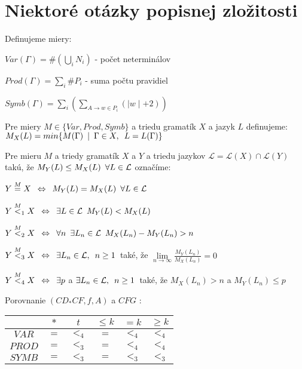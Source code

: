 \section{Niektoré otázky popisnej zložitosti}

\begin{definicia}
Definujeme miery:
\begin{description}
\item{} $Var(\Gamma)=\#(\underset{i}\bigcup N_i)$ - počet neterminálov
\item{} $Prod(\Gamma)=\underset{i}\sum \#P_i$ - suma počtu pravidiel
\item{} $Symb(\Gamma)=\underset{i} \sum(\underset{A\rightarrow w \in P_i} \sum (\mid w
\mid +2))$
\end{description}
\end{definicia}

\begin{definicia}
Pre miery $M \in \{Var, Prod, Symb\}$ a triedu gramatík $X$ a jazyk $L$ definujeme:
$M_X(L)=min\{M(\Gamma)\enspace |\enspace \Gamma \in X,\enspace L=L(\Gamma)\}$
\end{definicia}

\begin{definicia}
Pre mieru $M$ a triedy gramatík $X$ a $Y$ a triedu jazykov
$\mathcal{L}=\mathcal{L}(X)\cap \mathcal{L}(Y)$ takú, že $M_Y(L)\leq M_X(L)\enspace\forall
L\in\mathcal{L}$ označíme:
\begin{description}
\item{} $Y\overset{M}=X \enspace\Leftrightarrow\enspace M_Y(L)=M_X(L) \enspace\forall L\in\mathcal{L}$
\item{} $Y\overset{M}<_1X\enspace\Leftrightarrow\enspace \exists L\in\mathcal{L}\enspace
M_Y(L)<M_X(L)$
\item{} $Y\overset{M}<_2X\enspace\Leftrightarrow\enspace \forall n\enspace\exists L_n\in\mathcal{L}\enspace
M_X(L_n)-M_Y(L_n)>n$
\item{} $Y\overset{M}<_3X\enspace\Leftrightarrow\enspace \exists L_n\in\mathcal{L},\enspace
n\geq 1 \enspace$také, že $\underset{n\rightarrow \infty}\lim\frac{M_Y(L_n)}{M_X(L_n)}=0$
\item{} $Y\overset{M}<_4X\enspace\Leftrightarrow\enspace \exists p$ a $\exists
L_n\in\mathcal{L},\enspace n\geq 1\enspace$také, že $M_X(L_n)>n$ a $M_Y(L_n)\leq p$
\end{description}
\end{definicia}

\begin{veta}
Porovnanie $(CD_*CF,f,A)$ a $CFG$ :
\begin{center}
\begin{tabular}{c||c|c|c|c|c}
       & $*$ &  $t$  & $\leq k$ & $=k$  & $\geq k$  \\
  \hline\hline
$VAR$  & $=$ & $<_4$ & $=$      & $<_4$ & $<_4$    \\
  \hline
$PROD$ & $=$ & $<_3$ & $=$      & $<_4$ & $<_4$    \\
  \hline
$SYMB$ & $=$ & $<_3$ & $=$      & $<_3$ & $<_3$    \\

\end{tabular}
\end{center}
\end{veta}

